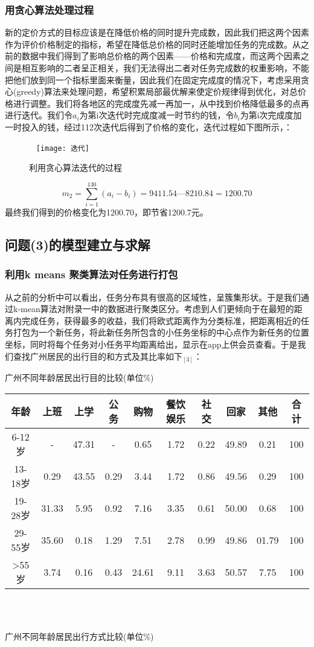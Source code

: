 \documentclass{ctexart}
\begin{document}
\subsubsection{用贪心算法处理过程}
新的定价方式的目标应该是在降低价格的同时提升完成数，因此我们把这两个因素作为评价价格制定的指标，希望在降低总价格的同时还能增加任务的完成数。从之前的数据中我们得到了影响总价格的两个因素——价格和完成度，而这两个因素之间是相互影响的二者呈正相关，我们无法得出二者对任务完成数的权重影响，不能把他们放到同一个指标里面来衡量，因此我们在固定完成度的情况下，考虑采用贪心(greedy)算法来处理问题，希望积累局部最优解来使定价规律得到优化，对总价格进行调整。我们将各地区的完成度先减一再加一，从中找到价格降低最多的点再进行迭代。我们令$a_i$为第i次迭代时完成度减一时节约的钱，令$b_i$为第i次完成度加一时投入的钱，经过112次迭代后得到了价格的变化，迭代过程如下图所示，：
\begin{figure}[htbp]  
\centering
\texttt{[image: 迭代]} 
\caption{利用贪心算法迭代的过程}
\end{figure}
\newpage
\begin{equation}
m_2=\sum^{130}_{i=1}(a_i-b_i)=9411.54—8210.84=1200.70
\end{equation}
最终我们得到的价格变化为1200.70，即节省1200.7元。

\subsection{问题(3)的模型建立与求解}
\subsubsection{利用k means 聚类算法对任务进行打包}
从之前的分析中可以看出，任务分布具有很高的区域性，呈簇集形状。于是我们通过k-mean算法对附录一中的数据进行聚类区分。考虑到人们更倾向于在最短的距离内完成任务，获得最多的收益，我们将欧式距离作为分类标准，把距离相近的任务打包为一个新任务，将此新任务所包含的小任务坐标的中心点作为新任务的位置坐标，同时将每个任务对小任务平均距离给出，显示在app上供会员查看。于是我们查找广州居民的出行目的和方式及其比率如下$_{[3]}$：
\\
\centerline{广州不同年龄居民出行目的比较(单位\%)}

\begin{tabular}{|cccccccccc|}

\hline
年龄 &上班&上学&公务&购物&餐饮娱乐&社交&回家&其他&合计\\
\hline
6-12岁 &-&47.31&-&0.65&1.72&0.22&49.89&0.21&100\\
\hline
13-18岁 &0.29&43.55&0.29&3.44&1.72&0.86&49.56&0.29&100\\
\hline
19-28岁 &31.33&5.95&0.92&7.16&3.35&0.61&50.00&0.68&100\\
\hline
29-55岁 &35.60&0.18&1.29&7.51&2.78&0.99&49.86&01.79&100\\
\hline
>55岁 &3.74&0.16&0.43&24.61&9.11&3.63&50.57&7.75&100\\
\hline
\end{tabular}
\\
\\
\centerline{广州不同年龄居民出行方式比较(单位\%)}
\end{document}
